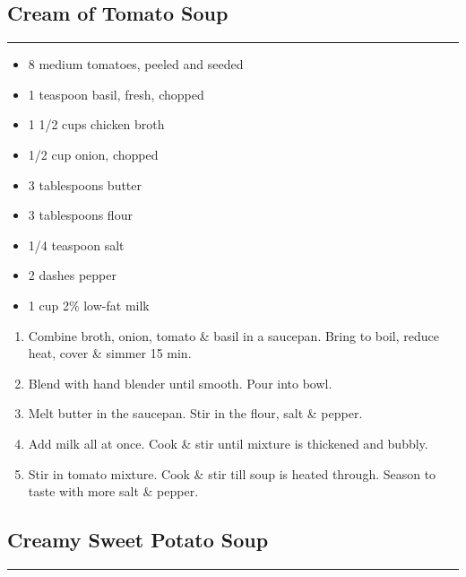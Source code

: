 \documentclass{article}
\begin{document}
\subsection{Cream of Tomato Soup} 
\noindent\rule[0.5ex]{\linewidth}{1pt}

\begin{framed}
    \begin{itemize}
        \item 8 medium tomatoes, peeled and seeded
        \item 1 teaspoon basil, fresh, chopped
        \item 1 1/2 cups chicken broth
        \item 1/2 cup onion, chopped
        \item 3 tablespoons butter
        \item 3 tablespoons flour
        \item 1/4 teaspoon salt
        \item 2 dashes pepper
        \item 1 cup 2\% low-fat milk
    \end{itemize}
\end{framed}

\begin{enumerate}
    \item 
        Combine broth, onion, tomato \& basil in a saucepan. Bring to boil, reduce heat, cover \& simmer 15 min.
    \item 
        Blend with hand blender until smooth. Pour into bowl.
    \item
        Melt butter in the saucepan. Stir in the flour, salt \& pepper.
    \item 
        Add milk all at once. Cook \& stir until mixture is thickened and bubbly.
    \item 
        Stir in tomato mixture. Cook \& stir till soup is heated through. Season to taste with more salt \& pepper.
\end{enumerate}
\newpage

\subsection{Creamy Sweet Potato Soup} 
\noindent\rule[0.5ex]{\linewidth}{1pt}
\end{document}
